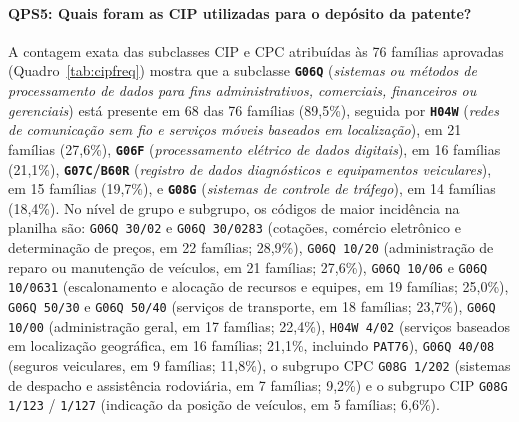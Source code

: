 \documentclass[12pt,a4paper]{article}
\begin{document}
\paragraph{QPS5: Quais foram as CIP utilizadas para o depósito da patente?}
A contagem exata das subclasses CIP e CPC atribuídas às 76 famílias aprovadas (Quadro~\ref{tab:cipfreq}) mostra que a subclasse \textbf{\texttt{G06Q}} (\textit{sistemas ou métodos de processamento de dados para fins administrativos, comerciais, financeiros ou gerenciais}) está presente em 68 das 76 famílias (89,5\%), seguida por \textbf{\texttt{H04W}} (\textit{redes de comunicação sem fio e serviços móveis baseados em localização}), em 21 famílias (27,6\%), \textbf{\texttt{G06F}} (\textit{processamento elétrico de dados digitais}), em 16 famílias (21,1\%), \textbf{\texttt{G07C}/\texttt{B60R}} (\textit{registro de dados diagnósticos e equipamentos veiculares}), em 15 famílias (19,7\%), e \textbf{\texttt{G08G}} (\textit{sistemas de controle de tráfego}), em 14 famílias (18,4\%). No nível de grupo e subgrupo, os códigos de maior incidência na planilha são: \texttt{G06Q 30/02} e \texttt{G06Q 30/0283} (cotações, comércio eletrônico e determinação de preços, em 22 famílias; 28,9\%), \texttt{G06Q 10/20} (administração de reparo ou manutenção de veículos, em 21 famílias; 27,6\%), \texttt{G06Q 10/06} e \texttt{G06Q 10/0631} (escalonamento e alocação de recursos e equipes, em 19 famílias; 25,0\%), \texttt{G06Q 50/30} e \texttt{G06Q 50/40} (serviços de transporte, em 18 famílias; 23,7\%), \texttt{G06Q 10/00} (administração geral, em 17 famílias; 22,4\%), \texttt{H04W 4/02} (serviços baseados em localização geográfica, em 16 famílias; 21,1\%, incluindo \texttt{PAT76}), \texttt{G06Q 40/08} (seguros veiculares, em 9 famílias; 11,8\%), o subgrupo CPC \texttt{G08G 1/202} (sistemas de despacho e assistência rodoviária, em 7 famílias; 9,2\%) e o subgrupo CIP \texttt{G08G 1/123} / \texttt{1/127} (indicação da posição de veículos, em 5 famílias; 6,6\%).
\end{document}
